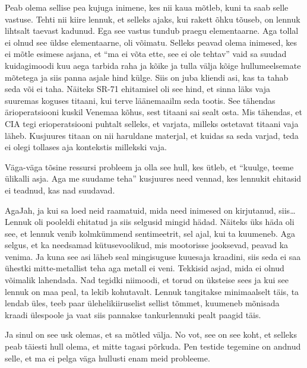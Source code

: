 Peab olema sellise pea kujuga inimene, kes nii kaua mõtleb, kuni ta saab selle vastuse. Tehti nii kiire lennuk, et  selleks ajaks, kui rakett õhku tõuseb, on lennuk lihtsalt taevast kadunud. Ega see vastus tundub praegu elementaarne. Aga tollal  ei olnud see üldse elementaarne,  oli võimatu. Selleks peavad olema  inimesed, kes ei mõtle esimese asjana, et \enquote{ma ei võta ette, see ei ole tehtav} vaid sa suudad kuidagimoodi kuu aega tarbida raha ja kõike  ja tulla välja kõige hullumeelsemate mõtetega ja siis panna asjale hind külge. Siis on juba kliendi asi, kas ta tahab seda või ei taha. Näiteks SR-71 ehitamisel oli see hind, et sinna läks vaja suuremas koguses titaani, kui terve läänemaailm seda tootis. See tähendas ärioperatsiooni kuskil Venemaa kõhus, sest titaani sai sealt osta. Mis tähendas, et CIA tegi erioperatsiooni puhtalt selleks, et varjata, milleks ostetavat titaani vaja läheb. Kusjuures titaan on nii haruldane materjal, et kuidas sa seda varjad, teda ei olegi tollases aja kontekstis millekski vaja. 


Väga-väga tõsine  ressursi probleem ja olla see hull, kes ütleb, et \enquote{kuulge, teeme ülikalli asja. Aga me suudame teha} kusjuures need vennad, kes lennukit ehitasid ei teadnud, kas nad suudavad. 


AgaJah, ja kui sa loed neid raamatuid, mida need inimesed on kirjutanud, siis\ldots Lennuk oli pooleldi ehitatud ja siis selgusid mingid hädad. Näiteks üks häda oli see, et lennuk venib kolmkümmend sentimeetrit, sel ajal, kui ta kuumeneb. Aga selgus, et ka needsamad kütusevoolikud, mis mootorisse jooksevad, peavad ka venima. Ja kuna see asi läheb seal mingisuguse kuuesaja kraadini, siis seda ei saa ühestki mitte-metallist teha aga metall ei veni. Tekkisid asjad, mida ei olnud võimalik lahendada. Nad tegidki niimoodi, et torud on üksteise sees ja kui see lennuk on maa peal, ta lekib kohutavalt. Lennuk tangitakse minimaalselt täis,  ta lendab üles, teeb paar ülehelikiiruselist sellist tõmmet, kuumeneb mõnisada kraadi ülespoole ja vaat siis pannakse tankurlennuki pealt paagid täis. 


Ja sinul on see usk olemas, et sa mõtled välja. No vot, see on see koht, et selleks peab täiesti hull olema, et  mitte tagasi põrkuda. Pen testide tegemine on andnud selle, et ma ei pelga väga hullusti enam meid probleeme. 

